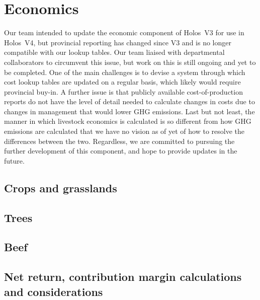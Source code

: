 \chapter{Economics}
\label{ch:economics}

Our team intended to update the economic component of Holos~V3 for use in
Holos~V4, but provincial reporting has changed since V3 and is no longer
compatible with our lookup tables. Our team liaised with departmental
collaborators to circumvent this issue, but work on this is still ongoing and
yet to be completed. One of the main challenges is to devise a system through
which cost lookup tables are updated on a regular basis, which likely would
require provincial buy-in. A further issue is that publicly available
cost-of-production reports do not have the level of detail needed to calculate
changes in costs due to changes in management that would lower GHG emissions.
Last but not least, the manner in which livestock economics is calculated is so
different from how GHG emissions are calculated that we have no vision as of
yet of how to resolve the differences between the two. Regardless, we are
committed to pursuing the further development of this component, and hope to
provide updates in the future.

\section{Crops and grasslands}
\label{sec:econ-crops}

\section{Trees}
\label{sec:econ-trees}

\section{Beef}
\label{sec:econ-beef}

\section{Net return, contribution margin calculations and considerations}
\label{sec:econ-net-return}
